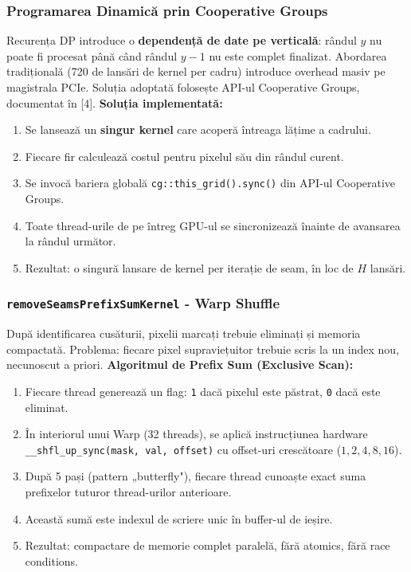 \documentclass[12pt,a4paper]{article}
\begin{document}
\subsubsection{Programarea Dinamică prin Cooperative Groups}
Recurența DP introduce o \textbf{dependență de date pe verticală}: rândul $y$ nu poate fi procesat până când rândul $y{-}1$ nu este complet finalizat. Abordarea tradițională (720 de lansări de kernel per cadru) introduce overhead masiv pe magistrala PCIe. Soluția adoptată folosește API-ul Cooperative Groups, documentat în [4].
\textbf{Soluția implementată:}
\begin{enumerate}[noitemsep]
    \item Se lansează un \textbf{singur kernel} care acoperă întreaga lățime a cadrului.
    \item Fiecare fir calculează costul pentru pixelul său din rândul curent.
    \item Se invocă bariera globală \texttt{cg::this\_grid().sync()} din API-ul Cooperative Groups.
    \item Toate thread-urile de pe întreg GPU-ul se sincronizează înainte de avansarea la rândul următor.
    \item Rezultat: o singură lansare de kernel per iterație de seam, în loc de $H$ lansări.
\end{enumerate}
\subsubsection{\texttt{removeSeamsPrefixSumKernel} - Warp Shuffle}
După identificarea cusăturii, pixelii marcați trebuie eliminați și memoria compactată. Problema: fiecare pixel supraviețuitor trebuie scris la un index nou, necunoscut a priori.
\textbf{Algoritmul de Prefix Sum (Exclusive Scan):}
\begin{enumerate}[noitemsep]
    \item Fiecare thread generează un flag: \texttt{1} dacă pixelul este păstrat, \texttt{0} dacă este eliminat.
    \item În interiorul unui Warp (32 threads), se aplică instrucțiunea hardware \texttt{\_\_shfl\_up\_sync(mask, val, offset)} cu offset-uri crescătoare ($1, 2, 4, 8, 16$).
    \item După 5 pași (pattern „butterfly"), fiecare thread cunoaște exact suma prefixelor tuturor thread-urilor anterioare.
    \item Această sumă este indexul de scriere unic în buffer-ul de ieșire.
    \item Rezultat: compactare de memorie complet paralelă, fără atomics, fără race conditions.
\end{enumerate}
\end{document}
